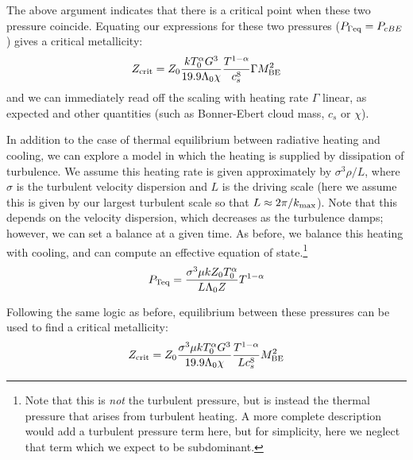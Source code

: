 \documentclass[useAMS,usenatbib]{mn2e}
\begin{document}
The above argument indicates that there is a critical point when these two pressure coincide.  Equating our expressions for these two pressures ($P_{\Gamma \rm eq} = P_{cBE}$) gives a critical metallicity:
\begin{equation}
Z_{\rm crit} = Z_0 \frac{ k T_0^\alpha G^3}{19.9 \Lambda_0 \chi} \frac{T^{1-\alpha}}{c_s^8} \Gamma M_{\rm BE}^2
\label{eq:crit_zl}
\end{equation}
and we can immediately read off the scaling with heating rate $\Gamma$ linear, as expected and other quantities (such as Bonner-Ebert cloud mass, $c_s$ or $\chi$).

In addition to the case of thermal equilibrium between radiative heating and cooling, we can explore a model in which the heating is supplied by dissipation of turbulence.  We assume this heating rate is given approximately by $\sigma^3 \rho / L$, where $\sigma$ is the turbulent velocity dispersion and $L$ is the driving scale (here we assume this is given by our largest turbulent scale so that $L \approx 2 \pi / k_{\rm max}$).  Note that this depends on the velocity dispersion, which decreases as the turbulence damps; however, we can set a balance at a given time.   As before, we balance this heating with cooling, and can compute an effective equation of state.\footnote{Note that this is {\it not} the turbulent pressure, but is instead the thermal pressure that arises from turbulent heating.  A more complete description would add a turbulent pressure term here, but for simplicity, here we neglect that term which we expect to be subdominant.}
\begin{equation}
P_{\rm Teq} = \frac{\sigma^3 \mu k Z_0 T_0^{\alpha}}{L \Lambda_0 Z} T^{1-\alpha}
\label{eq:Teq}
\end{equation}

Following the same logic as before, equilibrium between these pressures can be used to find a critical metallicity:
\begin{equation}
Z_{\rm crit} = Z_0 \frac{ \sigma^3 \mu k T_0^\alpha G^3}{19.9 \Lambda_0 \chi} \frac{T^{1-\alpha}}{L c_s^8} M_{\rm BE}^2
\label{eq:crit_zt}
\end{equation}
\end{document}
